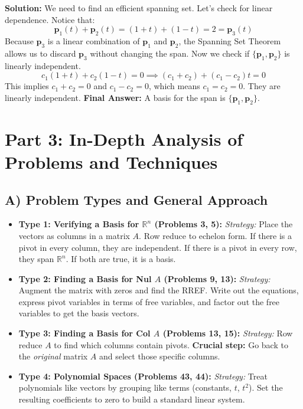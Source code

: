 \documentclass[12pt]{article}
\begin{document}
\textbf{Solution:}
We need to find an efficient spanning set. Let's check for linear dependence. Notice that:
\[ \mathbf{p}_1(t) + \mathbf{p}_2(t) = (1+t) + (1-t) = 2 = \mathbf{p}_3(t) \]
Because $\mathbf{p}_3$ is a linear combination of $\mathbf{p}_1$ and $\mathbf{p}_2$, the Spanning Set Theorem allows us to discard $\mathbf{p}_3$ without changing the span.
Now we check if $\{\mathbf{p}_1, \mathbf{p}_2\}$ is linearly independent.
\[ c_1(1+t) + c_2(1-t) = 0 \implies (c_1+c_2) + (c_1-c_2)t = 0 \]
This implies $c_1+c_2=0$ and $c_1-c_2=0$, which means $c_1=c_2=0$. They are linearly independent.
\textbf{Final Answer:} A basis for the span is $\{\mathbf{p}_1, \mathbf{p}_2\}$.

\newpage
\section{Part 3: In-Depth Analysis of Problems and Techniques}

\subsection{A) Problem Types and General Approach}
\begin{itemize}
    \item \textbf{Type 1: Verifying a Basis for $\mathbb{R}^n$ (Problems 3, 5):} 
    \textit{Strategy:} Place the vectors as columns in a matrix $A$. Row reduce to echelon form. If there is a pivot in every column, they are independent. If there is a pivot in every row, they span $\mathbb{R}^n$. If both are true, it is a basis.
    \item \textbf{Type 2: Finding a Basis for Nul $A$ (Problems 9, 13):}
    \textit{Strategy:} Augment the matrix with zeros and find the RREF. Write out the equations, express pivot variables in terms of free variables, and factor out the free variables to get the basis vectors.
    \item \textbf{Type 3: Finding a Basis for Col $A$ (Problems 13, 15):}
    \textit{Strategy:} Row reduce $A$ to find which columns contain pivots. \textbf{Crucial step:} Go back to the \textit{original} matrix $A$ and select those specific columns.
    \item \textbf{Type 4: Polynomial Spaces (Problems 43, 44):}
    \textit{Strategy:} Treat polynomials like vectors by grouping like terms (constants, $t$, $t^2$). Set the resulting coefficients to zero to build a standard linear system.
\end{itemize}
\end{document}

